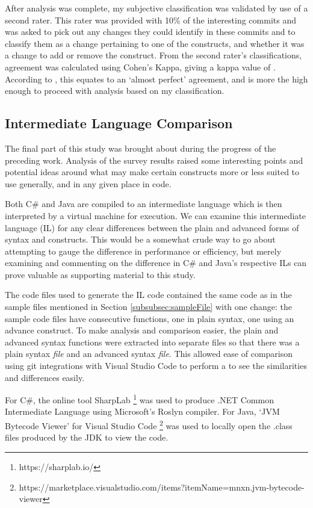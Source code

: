 \documentclass{article}
\begin{document}
        After analysis was complete, my subjective classification was validated by use of a second rater. This rater was provided with 10\% of the interesting commits and was asked to pick out any changes they could identify in these commits and to classify them as a change pertaining to one of the constructs, and whether it was a change to add or remove the construct. From the second rater's classifications, agreement was calculated using Cohen's Kappa, giving a kappa value of . According to \cite{cohensKappa}, this equates to an `almost perfect' agreement, and is more the high enough to proceed with analysis based on my classification.

    \subsection{Intermediate Language Comparison}
        The final part of this study was brought about during the progress of the preceding work. Analysis of the survey results raised some interesting points and potential ideas around what may make certain constructs more or less suited to use generally, and in any given place in code.

        Both C\# and Java are compiled to an intermediate language which is then interpreted by a virtual machine for execution. We can examine this intermediate language (IL) for any clear differences between the plain and advanced forms of syntax and constructs. This would be a somewhat crude way to go about attempting to gauge the difference in performance or efficiency, but merely examining and commenting on the difference in C\# and Java's respective ILs can prove valuable as supporting material to this study.
        
        The code files used to generate the IL code contained the same code as in the sample files mentioned in Section \ref{subsubsec:sampleFile} with one change: the sample code files have consecutive functions, one in plain syntax, one using an advance construct. To make analysis and comparison easier, the plain and advanced syntax functions were extracted into separate files so that there was a plain syntax \emph{file} and an advanced syntax \emph{file}. This allowed ease of comparison using git integrations with Visual Studio Code to perform a  to see the similarities and differences easily. 

        For C\#, the online tool SharpLab \footnote{https://sharplab.io/} was used to produce .NET Common Intermediate Language using Microsoft's Roslyn  compiler. For Java, `JVM Bytecode Viewer' for Visual Studio Code \footnote{https://marketplace.visualstudio.com/items?itemName=mnxn.jvm-bytecode-viewer} was used to locally open the .class files produced by the JDK to view the code.
\end{document}
